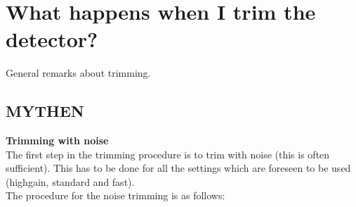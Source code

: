 \section{What happens when I trim the detector?}

General remarks about trimming.

\subsection{MYTHEN}

\textbf{Trimming with noise} \label{sec:noisetrim}\\

The first step in the trimming procedure is to trim with noise (this is often sufficient). This has to be done for all the settings which are foreseen to be used (highgain, standard and fast).\\
The procedure for the noise trimming is as follows:
